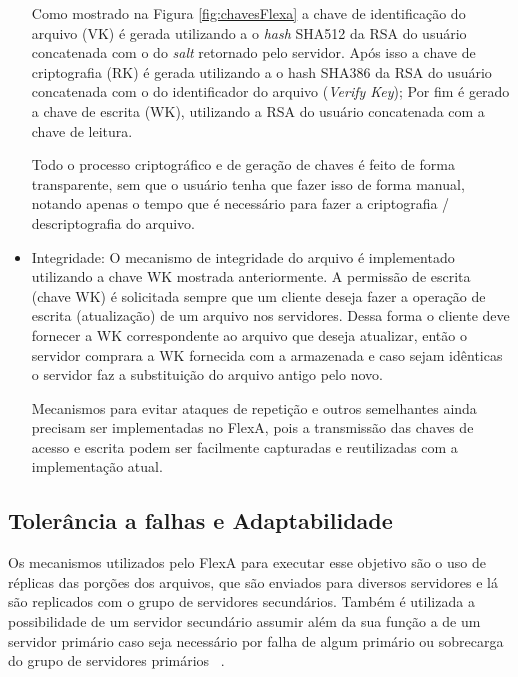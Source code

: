 \begin{itemize}
        	    Como mostrado na Figura \ref{fig:chavesFlexa} a chave de identificação do arquivo (VK) é gerada utilizando a o \textit{hash} SHA512 da RSA do usuário concatenada com o do \textit{salt} retornado pelo servidor.
        	    Após isso a chave de criptografia (RK) é gerada utilizando a o hash SHA386 da RSA do usuário concatenada com o do identificador do arquivo (\textit{Verify Key});
        	    Por fim é gerado a chave de escrita (WK), utilizando a RSA do usuário concatenada com a chave de leitura.
        	    
        	    Todo o processo criptográfico e de geração de chaves é feito de forma transparente, sem que o usuário tenha que fazer isso de forma manual, notando apenas o tempo que é necessário para fazer a criptografia / descriptografia do arquivo.
    	    
        \item Integridade: O mecanismo de integridade do arquivo é implementado utilizando a chave WK mostrada anteriormente. A permissão de escrita (chave WK) é solicitada sempre que um cliente deseja fazer a operação de escrita (atualização) de um arquivo nos servidores. Dessa forma o cliente deve fornecer a WK correspondente ao arquivo que deseja atualizar, então o servidor comprara a WK fornecida com a armazenada e caso sejam idênticas o servidor faz a substituição do arquivo antigo pelo novo.
        
        Mecanismos para evitar ataques de repetição e outros semelhantes ainda precisam ser implementadas no FlexA, pois a transmissão das chaves de acesso e escrita podem ser facilmente capturadas e reutilizadas com a implementação atual.
        
    \end{itemize}
    
    \subsection{Tolerância a falhas e Adaptabilidade}
        
        Os mecanismos utilizados pelo FlexA para executar esse objetivo são o uso de réplicas das porções dos arquivos, que são enviados para diversos servidores e lá são replicados com o grupo de servidores secundários. Também é utilizada a possibilidade de um servidor secundário assumir além da sua função a de um servidor primário caso seja necessário por falha de algum primário ou sobrecarga do grupo de servidores primários ~\cite{mario}.
        
